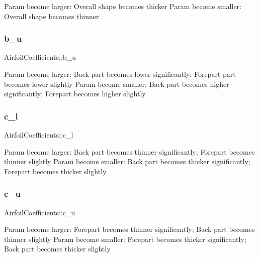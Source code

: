 Param become larger\+: Overall shape becomes thicker Param become smaller\+: Overall shape becomes thinner \mbox{\label{struct_airfoil_coefficients_aaa3ac1f49bc08223607d6ac4864baaae}} 
\subsubsection{\texorpdfstring{b\+\_\+u}{b\_u}}
{\footnotesize\ttfamily Airfoil\+Coefficients\+::b\+\_\+u}

Param become larger\+: Back part becomes lower significantly; Forepart part becomes lower slightly Param become smaller\+: Back part becomes higher significantly; Forepart becomes higher slightly \mbox{\label{struct_airfoil_coefficients_aadd3f8683942976ea04c91b2afef18ad}} 
\subsubsection{\texorpdfstring{c\+\_\+l}{c\_l}}
{\footnotesize\ttfamily Airfoil\+Coefficients\+::c\+\_\+l}

Param become larger\+: Back part becomes thinner significantly; Forepart becomes thinner slightly Param become smaller\+: Back part becomes thicker significantly; Forepart becomes thicker slightly \mbox{\label{struct_airfoil_coefficients_a89bcbee889a35e1a184014b750195b37}} 
\subsubsection{\texorpdfstring{c\+\_\+u}{c\_u}}
{\footnotesize\ttfamily Airfoil\+Coefficients\+::c\+\_\+u}

Param become larger\+: Forepart becomes thinner significantly; Back part becomes thinner slightly Param become smaller\+: Forepart becomes thicker significantly; Back part becomes thicker slightly \mbox{\label{struct_airfoil_coefficients_abc1b88aeefdc2659a2585532a426279f}} 
